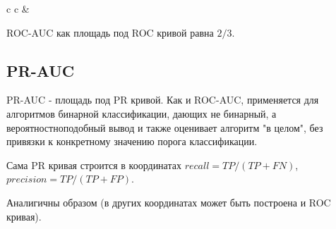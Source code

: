 \begin{tabular}{ c c }
    & 
\end{tabular}

ROC-AUC как площадь под ROC кривой равна $2/3$.


\subsection{PR-AUC}\label{pr-auc}

PR-AUC - площадь под PR кривой. Как и ROC-AUC, применяется для алгоритмов бинарной классификации, дающих не бинарный, а вероятностноподобный вывод и также оценивает алгоритм "в целом", без привязки к конкретному значению порога классификации.

Сама PR кривая строится в координатах $recall = TP/(TP + FN)$, $precision = TP/(TP + FP)$. 

Аналигичны образом (в других координатах может быть построена и ROC кривая).

